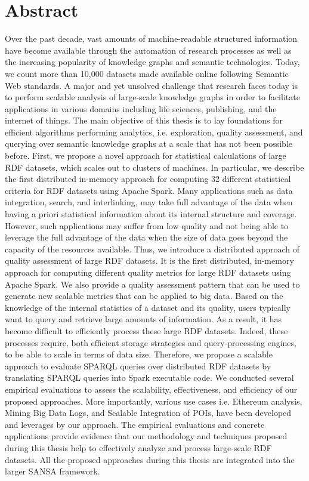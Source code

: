 \chapter*{Abstract}

Over the past decade, vast amounts of machine-readable structured information have become available through the automation of research processes as well as the increasing popularity of knowledge graphs and semantic technologies. 
Today, we count more than 10,000 datasets made available online following Semantic Web standards.
A major and yet unsolved challenge that research faces today is to perform scalable analysis of large-scale knowledge graphs in order to facilitate applications in various domains including life sciences, publishing, and the internet of things.
The main objective of this thesis is to lay foundations for efficient algorithms performing analytics, i.e. exploration, quality assessment, and querying over semantic knowledge graphs at a scale that has not been possible before.
First, we propose a novel approach for statistical calculations of large RDF datasets, which scales out to clusters of machines. 
In particular, we describe the first distributed in-memory approach for computing 32 different statistical criteria for RDF datasets using Apache Spark.
Many applications such as data integration, search, and interlinking, may take full advantage of the data when having a priori statistical information about its internal structure and coverage.
However, such applications may suffer from low quality and not being able to leverage the full advantage of the data when the size of data goes beyond the capacity of the resources available.
Thus, we introduce a distributed approach of quality assessment of large RDF datasets.
It is the first distributed, in-memory approach for computing different quality metrics for large RDF datasets using Apache Spark. We also provide a quality assessment pattern that can be used to generate new scalable metrics that can be applied to big data.
Based on the knowledge of the internal statistics of a dataset and its quality, users typically want to query and retrieve large amounts of information.
As a result, it has become difficult to efficiently process these large RDF datasets.
Indeed, these processes require, both efficient storage strategies and query-processing engines, to be able to scale in terms of data size.
Therefore, we propose a scalable approach to evaluate SPARQL queries over distributed RDF datasets by translating SPARQL queries into Spark executable code.
We conducted several empirical evaluations to assess the scalability, effectiveness, and efficiency of our proposed approaches.
More importantly, various use cases i.e. Ethereum analysis, Mining Big Data Logs, and Scalable Integration of POIs, have been developed and leverages by our approach. 
The empirical evaluations and concrete applications provide evidence that our methodology and techniques proposed during this thesis help to effectively analyze and process large-scale RDF datasets.
All the proposed approaches during this thesis are integrated into the larger SANSA framework.

